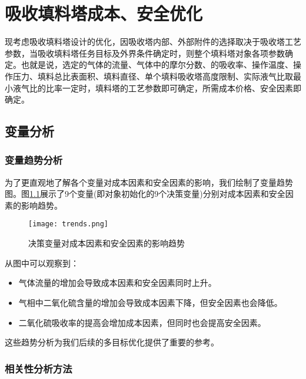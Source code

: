 \chapter{吸收填料塔成本、安全优化}

现考虑吸收填料塔设计的优化，因吸收塔内部、外部附件的选择取决于吸收塔工艺参数，当吸收填料塔任务目标及外界条件确定时，则整个填料塔对象各项参数确定。也就是说，选定的气体的流量、气体中的摩尔分数、的吸收率、操作温度、操作压力、填料总比表面积、填料直径、单个填料吸收塔高度限制、实际液气比取最小液气比的比率一定时，填料塔的工艺参数即可确定，所需成本价格、安全因素即确定。



\section{变量分析}

\subsection{变量趋势分析}

为了更直观地了解各个变量对成本因素和安全因素的影响，我们绘制了变量趋势图。图\ref{fig:trends}展示了9个变量(即对象初始化的9个决策变量)分别对成本因素和安全因素的影响趋势。

\begin{figure}[hbtp]
	\centering
	\texttt{[image: trends.png]}
	\caption{决策变量对成本因素和安全因素的影响趋势}
	\label{fig:trends}
\end{figure}

\clearpage

从图中可以观察到：

\begin{itemize}
	\item 气体流量的增加会导致成本因素和安全因素同时上升。
	\item 气相中二氧化硫含量的增加会导致成本因素下降，但安全因素也会降低。
	\item 二氧化硫吸收率的提高会增加成本因素，但同时也会提高安全因素。
\end{itemize}

这些趋势分析为我们后续的多目标优化提供了重要的参考。

\subsection{相关性分析方法}

